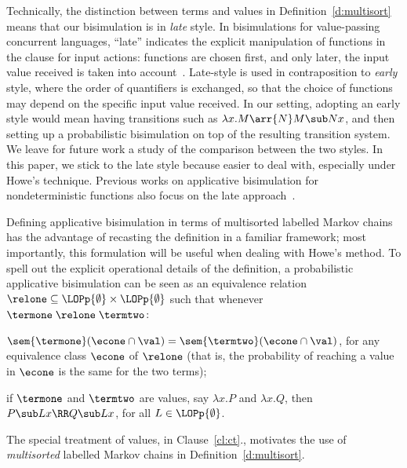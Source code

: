 \begin{remark}\label{r:el} 
  Technically, the distinction between terms and values in
  Definition~\ref{d:multisort} means that our
  bisimulation is in \emph{late} style. In bisimulations for
  value-passing concurrent languages, ``late'' indicates the explicit
  manipulation of functions in the clause for input actions: functions are
  chosen first, and only later, the input value received is taken into
  account~\cite{SaWabook}. Late-style is used in contraposition to 
  \emph{early} style, where the order of quantifiers is exchanged, so that the
  choice of functions may depend on the specific input value received.
  In our setting, adopting an early style would mean having transitions such as
  $\lambda x. M \arr{N} M \sub N x$, and then setting up a probabilistic
  bisimulation on top of the resulting transition system. 
  We leave for future work a study of the comparison between the two
  styles. In this paper, we stick to the late style because easier to deal with,
  especially under Howe's technique.
  Previous works on applicative
  bisimulation for nondeterministic functions also focus on the late
  approach~\cite{Ong93,PittsSurvey}.
\end{remark} 

\begin{remark}
\label{r:pabfirenze} 
Defining applicative bisimulation in terms of multisorted labelled Markov
chains has the advantage of recasting the definition in a familiar
framework; most importantly, this formulation will be useful when dealing
with Howe's method. To spell out the explicit operational details of the
definition, a probabilistic applicative bisimulation can be seen as an equivalence
relation $\relone\subseteq \LOPp{\emptyset}\times\LOPp{\emptyset}$ such
that whenever $\termone\mathrel{\relone}\termtwo$:
  \begin{varenumerate}
  \item $\sem{\termone}(\econe \cap
    \val)=\sem{\termtwo}(\econe \cap \val)$, for any
    equivalence class $\econe$ of $\relone$ 
(that
    is, the probability of reaching a value in $\econe$ is the same for the
    two terms);
  \item
    \label{cl:ct} if $\termone$ and $\termtwo$ are values, say $\lambda
    x. P $ and $ \lambda x. Q$, then $P \sub L x \RR Q \sub L x$, for
    all $L \in \LOPp{\emptyset}$.
  \end{varenumerate}
  The special treatment of values, in Clause~\ref{cl:ct}., motivates the
  use of \emph{multisorted} labelled Markov chains in Definition~\ref{d:multisort}.
\end{remark}


